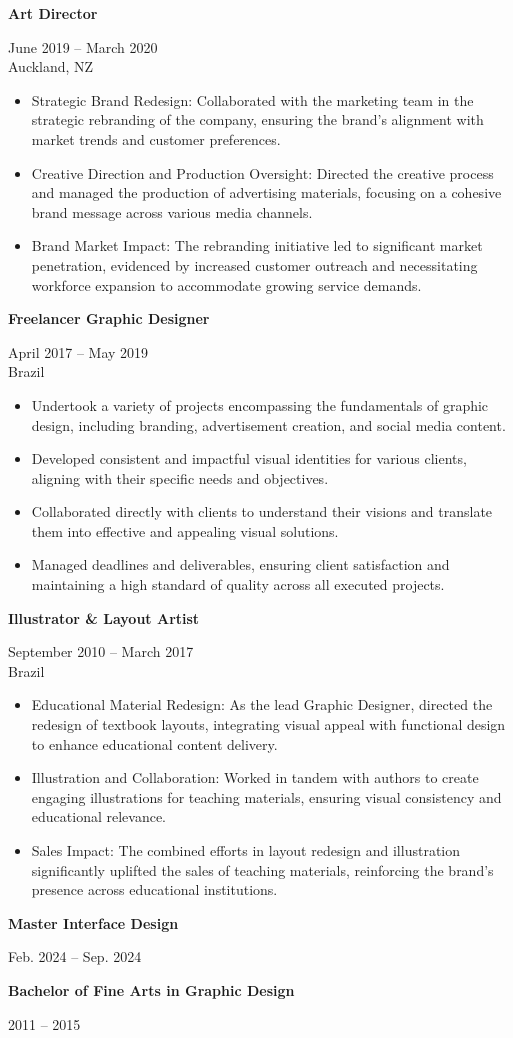 \documentclass[10pt,a4paper,ragged2e,withhyper]{altacv}
\renewcommand{\cvevent}[4]{%
  \textbf{#1} %
  \hfill %
  \begin{minipage}[t]{.5\linewidth}
    \raggedleft %
    \small#3 %
    \\ %
    #4 %
  \end{minipage}
  \vspace{\baselineskip} %
}
\begin{document}
\divider



\cvevent{Art Director}{Clean.com}{June 2019 -- March 2020}{Auckland, NZ}
\begin{itemize}
  \item Strategic Brand Redesign: Collaborated with the marketing team in the strategic rebranding of the company, ensuring the brand's alignment with market trends and customer preferences.
  \item Creative Direction and Production Oversight: Directed the creative process and managed the production of advertising materials, focusing on a cohesive brand message across various media channels.
  \item Brand Market Impact: The rebranding initiative led to significant market penetration, evidenced by increased customer outreach and necessitating workforce expansion to accommodate growing service demands.
\end{itemize}

\divider

\cvevent{Freelancer Graphic Designer}{}{April 2017 -- May 2019}{Brazil}
\begin{itemize}
  \item Undertook a variety of projects encompassing the fundamentals of graphic design, including branding, advertisement creation, and social media content.
  \item Developed consistent and impactful visual identities for various clients, aligning with their specific needs and objectives.
  \item Collaborated directly with clients to understand their visions and translate them into effective and appealing visual solutions.
  \item Managed deadlines and deliverables, ensuring client satisfaction and maintaining a high standard of quality across all executed projects.
\end{itemize}

\divider

\cvevent{Illustrator \& Layout Artist}{Editora Teth}{September 2010 -- March 2017}{Brazil}
\begin{itemize}
  \item Educational Material Redesign: As the lead Graphic Designer, directed the redesign of textbook layouts, integrating visual appeal with functional design to enhance educational content delivery.
  \item Illustration and Collaboration: Worked in tandem with authors to create engaging illustrations for teaching materials, ensuring visual consistency and educational relevance.
  \item Sales Impact: The combined efforts in layout redesign and illustration significantly uplifted the sales of teaching materials, reinforcing the brand's presence across educational institutions.
\end{itemize}

\vspace{0.5cm}


\cvevent{Master Interface Design}{Aela}{Feb. 2024 -- Sep. 2024}{}

\divider

\cvevent{Bachelor of Fine Arts in Graphic Design}{Universidade Estácio de Sá}{2011 -- 2015}{}
\end{document}
